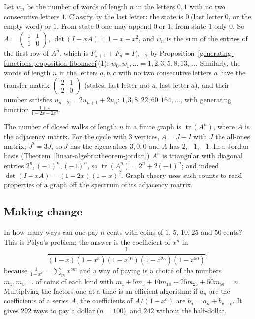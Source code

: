 \begin{example}\label{generating-functions:example-no-consecutive-ones}
Let $w_n$ be the number of words of length $n$ in the letters $0, 1$ with no two consecutive letters $1$. Classify by the last letter: the state is $0$ (last letter $0$, or the empty word) or $1$. From
state $0$ one may append $0$ or $1$; from state $1$ only $0$. So $A = \begin{pmatrix}1 & 1\\ 1 & 0\end{pmatrix}$, $\det(I - xA) = 1 - x - x^2$, and $w_n$ is the sum of the entries of the first row of
$A^n$, which is $F_{n+1} + F_n = F_{n+2}$ by Proposition~\ref{generating-functions:proposition-fibonacci}(1): $w_0, w_1, \ldots = 1, 2, 3, 5, 8, 13, \ldots$. Similarly, the words of length $n$ in
the letters $a, b, c$ with no two consecutive letters $a$ have the transfer matrix $\begin{pmatrix}2 & 1\\ 2 & 0\end{pmatrix}$ (states: last letter not $a$, last letter $a$), and their number satisfies
$u_{n+2} = 2u_{n+1} + 2u_n$: $1, 3, 8, 22, 60, 164, \ldots$, with generating function $\frac{1 + x}{1 - 2x - 2x^2}$.
\end{example}

\begin{example}\label{generating-functions:example-closed-walks}
The number of closed walks of length $n$ in a finite graph is $\operatorname{tr}(A^n)$, where $A$ is the adjacency matrix. For the cycle with $3$ vertices, $A = J - I$ with $J$ the all-ones
matrix; $J^2 = 3J$, so $J$ has the eigenvalues $3, 0, 0$ and $A$ has $2, -1, -1$. In a Jordan basis (Theorem~\ref{linear-algebra:theorem-jordan}) $A^n$ is triangular with diagonal entries
$2^n, (-1)^n, (-1)^n$, so $\operatorname{tr}(A^n) = 2^n + 2(-1)^n$; and indeed $\det(I - xA) = (1 - 2x)(1 + x)^2$. Graph theory uses such counts to read properties of a graph
off the spectrum of its adjacency matrix.
\end{example}

\subsection{Making change}\label{generating-functions:subsection-change}

In how many ways can one pay $n$ cents with coins of $1$, $5$, $10$, $25$ and $50$ cents? This is P\'olya's problem; the answer is the coefficient of $x^n$ in
\[
\frac{1}{(1 - x)(1 - x^5)(1 - x^{10})(1 - x^{25})(1 - x^{50})},
\]
because $\frac{1}{1 - x^c} = \sum_mx^{cm}$ and a way of paying is a choice of the numbers $m_1, m_5, \ldots$ of coins of each kind with $m_1 + 5m_5 + 10m_{10} + 25m_{25} + 50m_{50} = n$. Multiplying the
factors one at a time is an efficient algorithm: if $a_n$ are the coefficients of a series $A$, the coefficients of $A/(1 - x^c)$ are $b_n = a_n + b_{n-c}$. It gives $292$ ways to pay a dollar
($n = 100$), and $242$ without the half-dollar.

